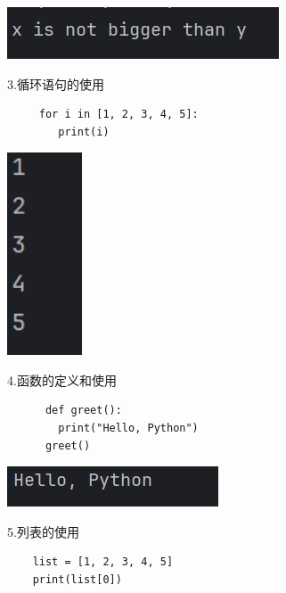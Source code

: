 \documentclass{article}
\begin{document}
\noindent
\begin{minipage}{\linewidth}
  \centering
  \includegraphics[width=0.5\linewidth]{python2.png}
  \label{fig:example}
\end{minipage}

3.循环语句的使用
 \begin{verbatim}
     for i in [1, 2, 3, 4, 5]:
        print(i)
 \end{verbatim}

\noindent
\begin{minipage}{\linewidth}
  \centering
  \includegraphics[width=0.5\linewidth,height=6cm]{python3.png}
  \label{fig:example}
\end{minipage}

4.函数的定义和使用
\begin{verbatim}
      def greet():
        print("Hello, Python") 
      greet()
\end{verbatim}

\noindent
\begin{minipage}{\linewidth}
 \centering
  \includegraphics[width=0.5\linewidth]{python4.png}
  \label{fig:example}
\end{minipage}



5.列表的使用
\begin{verbatim}
    list = [1, 2, 3, 4, 5]
    print(list[0])
\end{verbatim}
\end{document}
